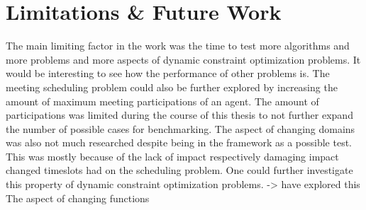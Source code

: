 \chapter{Limitations \& Future Work}
\label{c:limitations}

The main limiting factor in the work was the time to test more algorithms and more problems and more aspects of dynamic constraint optimization problems. \newline
It would be interesting to see how the performance of other problems is.
\newline
 The meeting scheduling problem could also be further explored by increasing the amount of maximum meeting participations of an agent. The amount of participations was limited during the course of this thesis to not further expand the number of possible cases for benchmarking. 
 \newline
 The aspect of changing domains was also not much researched despite being in the framework as a possible test. This was mostly because of the lack of impact respectively damaging impact changed timeslots  had on the scheduling problem. One could further investigate this property of dynamic constraint optimization problems. \cite{Yedidsion} -> have explored this
\newline
The aspect of changing functions
 

 